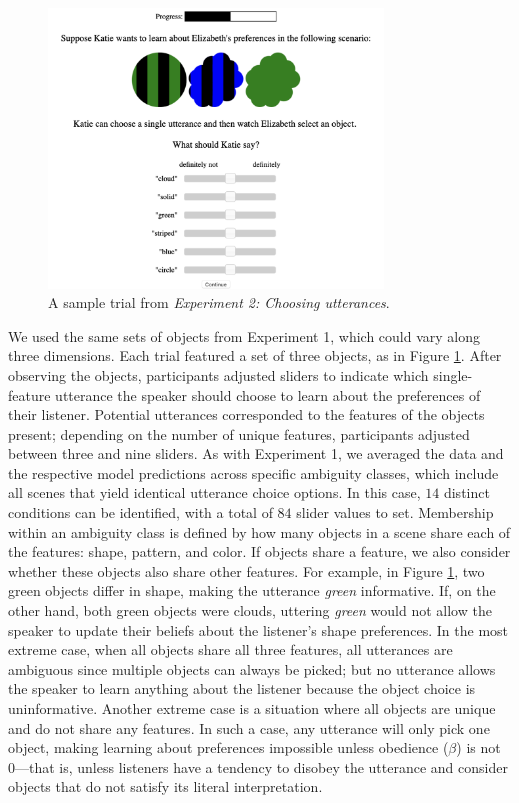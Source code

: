 \documentclass[10pt,a4paper]{article}
\begin{document}
\begin{figure}[ht]
	\centering
	\includegraphics[width=3.5in]{images/utterance-choice-trial.png}
	\caption{A sample trial from \emph{Experiment 2: Choosing utterances}. }\label{exp2-trial}
\end{figure} 

We used the same sets of objects from Experiment 1, which could vary along three dimensions. Each trial featured a set of three objects, as in Figure \ref{exp2-trial}. After observing the objects, participants adjusted sliders to indicate which single-feature utterance the speaker should choose to learn about the preferences of their listener. Potential utterances corresponded to the features of the objects present; depending on the number of unique features, participants adjusted between three and nine sliders. As with Experiment 1, we averaged the data and the respective model predictions across specific ambiguity classes, which include all scenes that yield identical utterance choice options. 
In this case, $14$ distinct conditions can be identified, with a total of $84$ slider values to set. 
Membership within an ambiguity class is defined by how many objects in a scene share each of the features: shape, pattern, and color. If objects share a feature, we also consider whether these objects also share other features. For example, in Figure \ref{exp2-trial}, two green objects differ in shape, making the utterance \textit{green} informative. If, on the other hand, both green objects were clouds, uttering \textit{green} would not allow the speaker to update their beliefs about the listener's shape preferences.
In the most extreme case, when all objects share all three features, all utterances are ambiguous since multiple objects can always be picked; but no utterance allows the speaker to learn anything about the listener because the object choice is uninformative. Another extreme case is a situation where all objects are unique and do not share any features. In such a case, any utterance will only pick one object, making learning about preferences impossible unless obedience ($\beta$) is not 0---that is, unless listeners have a tendency to disobey the utterance and consider objects that do not satisfy its literal interpretation.
\end{document}
